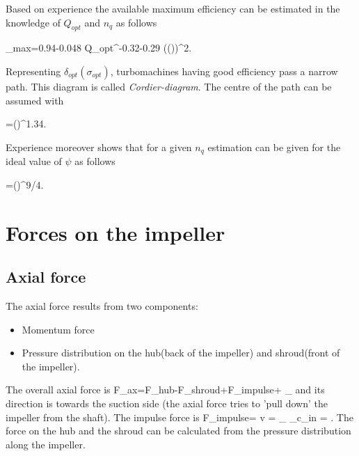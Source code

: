 Based on experience the available maximum efficiency can be estimated in the knowledge of $Q_{opt}$ and $n_q$ as follows

\beq
\eta_{max}=0.94-0.048 Q_{opt}^{-0.32}-0.29 \left(\log\left(\right)\right)^2.
\eeq

Representing $\delta_{opt}(\sigma_{opt})$, turbomachines having good efficiency pass a narrow path. This diagram is called \emph{Cordier-diagram}. The centre of the path can be assumed with

\beq
\delta=\left(\right)^{1.34}.
\eeq

Experience moreover shows that for a given $n_q$ estimation can be given for the ideal value of $\psi$ as follows

\beq
\psi=\left(\right)^{9/4}.
\eeq




\clearpage
\section{Forces on the impeller}

%

\subsection{Axial force}

The axial force results from two components:
\begin{itemize}
\item Momentum force
\item Pressure distribution on the hub(back of the impeller) and shroud(front of the impeller).
\end{itemize}

The overall axial force is
%
\beq
F_{ax}=F_{hub}-F_{shroud}+F_{impulse}+ _{}
\eeq
%
and its direction is towards the suction side (the axial force tries to 'pull down' the impeller from the shaft).
The impulse force is
\beq
F_{impulse}= v =  _{}  _{c_{in}} = \rho {}.
\eeq
The force on the hub and the shroud can be calculated from the pressure distribution along the impeller. 

